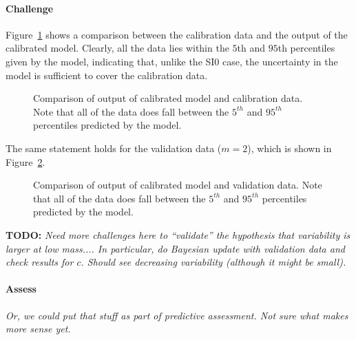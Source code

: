\documentclass[11pt]{article}
\begin{document}
\paragraph{Challenge}
Figure~\ref{fig:si2_cal_challenge} shows a comparison between the
calibration data and the output of the calibrated model.  Clearly, all
the data lies within the $5$th and $95$th percentiles given by the
model, indicating that, unlike the SI0 case, the uncertainty in the
model is sufficient to cover the calibration data.
%
\begin{figure}[ht]
\begin{center}
\end{center}
\caption{Comparison of output of calibrated model and calibration
  data.  Note that all of the data does fall between the $5^{th}$ and
  $95^{th}$ percentiles predicted by the model.}
\label{fig:si2_cal_challenge}
\end{figure}
% 
The same statement holds for the validation data ($m=2$), which is
shown in Figure~\ref{fig:si2_val_challenge}.
%
\begin{figure}[ht]
\begin{center}
\end{center}
\caption{Comparison of output of calibrated model and validation
  data.  Note that all of the data does fall between the $5^{th}$ and
  $95^{th}$ percentiles predicted by the model.}
\label{fig:si2_val_challenge}
\end{figure}
% 

{\bf TODO:} \emph{Need more challenges here to ``validate'' the
  hypothesis that variability is larger at low mass....  In
  particular, do Bayesian update with validation data and check
  results for $c$.  Should see decreasing variability (although it
  might be small).}

\paragraph{Assess}
\emph{Or, we could put that stuff as part of predictive assessment.
  Not sure what makes more sense yet.}
\end{document}
